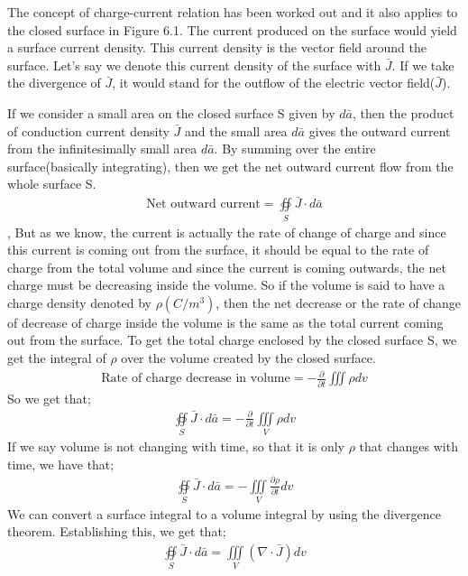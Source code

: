 The concept of charge-current relation has been worked out and it also applies to the closed surface in Figure 6.1. The current produced on the surface would yield a surface current density. This current density is the vector field around the surface. Let's say we denote this current density of the surface with $\bar{J}$. If we take the divergence of $\bar{J}$, it would stand for the outflow of the electric vector field($\bar{J}$).

If we consider a small area on the closed surface S given by $d\bar{a}$, then the product of conduction current density $\bar{J}$ and the small area $d\bar{a}$ gives the outward current from the infinitesimally small area $d\bar{a}$. By summing over the entire surface(basically integrating), then we get the net outward current flow from the whole surface S.
\begin{align*}
\text{Net outward current}= \oiint\limits_S\bar{J}\cdot d\bar{a}
\end{align*},
But as we know, the current is actually the rate of change of charge and since this current is coming out from the surface, it should be equal to the rate of charge from the total volume and since the current is coming outwards, the net charge must be decreasing inside the volume. So if the volume is said to have a charge density denoted by $\rho (C/m^{3})$, then the net decrease or the rate of change of decrease of charge inside the volume is the same as the total current coming out from the surface. To get the total charge enclosed by the closed surface S, we get the integral of $\rho$ over the volume created by the closed surface.
\begin{align*}
\text{Rate of charge decrease in volume}	= -\frac{\partial}{\partial t}\iiint \rho dv
\end{align*}
So we get that;
\begin{align*}
\oiint\limits_S\bar{J}\cdot d\bar{a} = -\frac{\partial}{\partial t}\iiint\limits_V\rho dv
\end{align*}
If we say volume is not changing with time, so that it is only $\rho$ that changes with time, we have that;
\begin{align*}
\oiint\limits_S\bar{J}\cdot d\bar{a} = -\iiint\limits_V\frac{\partial\rho}{\partial t}dv
\end{align*}
We can convert a surface integral to a volume integral by using the divergence theorem. Establishing this, we get that;
\begin{align*}
\oiint\limits_S\bar{J}\cdot d\bar{a} = \iiint\limits_V(\nabla\cdot\bar{J})dv
\end{align*}
